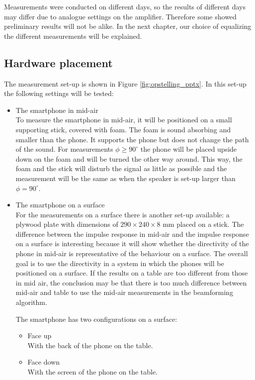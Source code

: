 Measurements were conducted on different days, so the results of different days may differ due to analogue settings on the amplifier.
Therefore some showed preliminary results will not be alike. 
In the next chapter, our choice of equalizing the different measurements will be explained.

\subsection{Hardware placement}
The measurement set-up is shown in Figure \ref{fig:opstelling_pptx}.
In this set-up the following settings will be tested:
\begin{itemize}
\item The smartphone in mid-air\\
To measure the smartphone in mid-air, it will be positioned on a small supporting stick, covered with foam.
The foam is sound absorbing and smaller than the phone.
It supports the phone but does not change the path of the sound.
For measurements $\phi\geq90^\circ$ the phone will be placed upside down on the foam and will be turned the other way around.
This way, the foam and the stick will disturb the signal as little as possible and the measurement will be the same as when the speaker is set-up larger than $\phi=90^\circ$.
\item The smartphone on a surface\\
For the measurements on a surface there is another set-up available: a plywood plate with dimensions of $290\times240\times8$ mm placed on a stick.
The difference between the impulse response in mid-air and the impulse response on a surface is interesting because it will show whether the directivity of the phone in mid-air is representative of the behaviour on a surface.
The overall goal is to use the directivity in a system in which the phones will be positioned on a surface. If the results on a table are too different from those in mid air, the conclusion may be that there is too much difference between mid-air and table to use the mid-air measurements in the beamforming algorithm.

The smartphone has two configurations on a surface:
\begin{itemize}
\item Face up\\
With the back of the phone on the table.
\item Face down\\
With the screen of the phone on the table.
\end{itemize}
\end{itemize}

